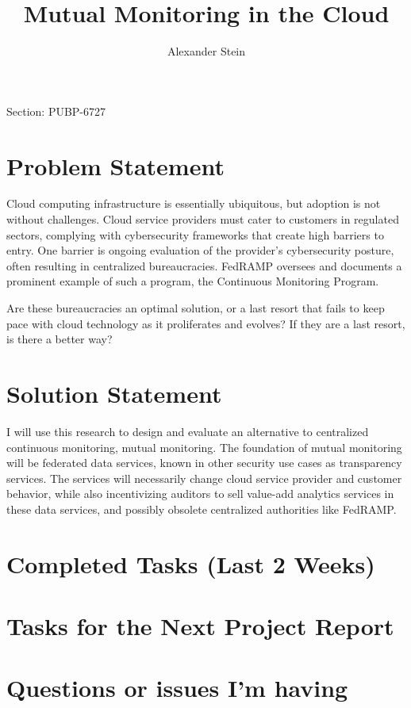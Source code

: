 \documentclass{jdf}
\begin{document}
Section: PUBP-6727
\title{Mutual Monitoring in the Cloud}
\author{Alexander Stein}

\maketitle
\thispagestyle{fancy}

\section{Problem Statement}

Cloud computing infrastructure is essentially ubiquitous, but adoption is not without challenges. Cloud service providers must cater to customers in regulated sectors, complying with cybersecurity frameworks that create high barriers to entry. One barrier is ongoing evaluation of the provider's cybersecurity posture, often resulting in centralized bureaucracies. FedRAMP oversees and documents a prominent example of such a program, the Continuous Monitoring Program.

Are these bureaucracies an optimal solution, or a last resort that fails to keep pace with cloud technology as it proliferates and evolves? If they are a last resort, is there a better way?

\section{Solution Statement}

I will use this research to design and evaluate an alternative to centralized continuous monitoring, mutual monitoring. The foundation of mutual monitoring will be federated data services, known in other security use cases as transparency services. The services will necessarily change cloud service provider and customer behavior, while also incentivizing auditors to sell value-add analytics services in these data services, and possibly obsolete centralized authorities like FedRAMP.

\section{Completed Tasks (Last 2 Weeks)}

\section{Tasks for the Next Project Report}

\section{Questions or issues I'm having}
\end{document}
